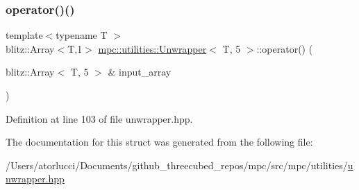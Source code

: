 \subsubsection{\texorpdfstring{operator()()}{operator()()}}
{\footnotesize\ttfamily template$<$typename T $>$ \\
blitz\+::\+Array$<$T,1$>$ \mbox{\hyperlink{structmpc_1_1utilities_1_1_unwrapper}{mpc\+::utilities\+::\+Unwrapper}}$<$ T, 5 $>$\+::operator() (\begin{DoxyParamCaption}\item[{blitz\+::\+Array$<$ T, 5 $>$ \&}]{input\+\_\+array }\end{DoxyParamCaption})\hspace{0.3cm}{\ttfamily [inline]}}



Definition at line 103 of file unwrapper.\+hpp.



The documentation for this struct was generated from the following file\+:\begin{DoxyCompactItemize}
\item 
/\+Users/atorlucci/\+Documents/github\+\_\+threecubed\+\_\+repos/mpc/src/mpc/utilities/\mbox{\hyperlink{unwrapper_8hpp}{unwrapper.\+hpp}}\end{DoxyCompactItemize}
